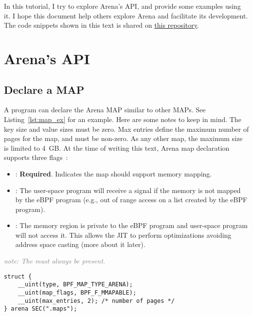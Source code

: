 \documentclass{article}
\begin{document}
In this tutorial, I try to explore Arena's API, and provide some examples using
it. I hope this document help others explore Arena and facilitate its
development. The code snippets shown in this text is shared on
\href{https://github.com/bpf-endeavor/ebpf-arena-tutorial}{this repository}.

\section{Arena's API}

\subsection{Declare a MAP}
A program can declare the Arena MAP similar to other MAPs. See Listing~\ref{lst:map_ex}
for an example. Here are some notes to keep in mind. The key size and value
sizes must be zero. Max entries define the maximum number of pages for the map,
and must be non-zero. As any other map, the maximum size is limited to 4~GB. At
the time of writing this text, Arena map declaration supports three
flags~\cite{arena_source}:
\begin{itemize}
    \item {}: \textbf{Required}. Indicates the map should
        support memory mapping.
    \item {}: The user-space program will receive a
         signal if the memory is not mapped by the eBPF program
        (e.g., out of range access on a list created by the eBPF program).
    \item {}: The memory region is private to the eBPF
        program and user-space program will not access it. This allows the JIT
        to perform optimizations avoiding address space casting (more about it
        later).
\end{itemize}
\textcolor{gray}{\textit{note: The  must always be present.}}

\begin{minipage}{\linewidth}
\centering
\begin{flushleft}
\begin{lstlisting}[caption={Example of using Arena map.}, label={lst:map_ex}]
struct {
    __uint(type, BPF_MAP_TYPE_ARENA);
    __uint(map_flags, BPF_F_MMAPABLE);
    __uint(max_entries, 2); /* number of pages */
} arena SEC(".maps");
\end{lstlisting}
\end{flushleft}
\end{minipage}
\end{document}
